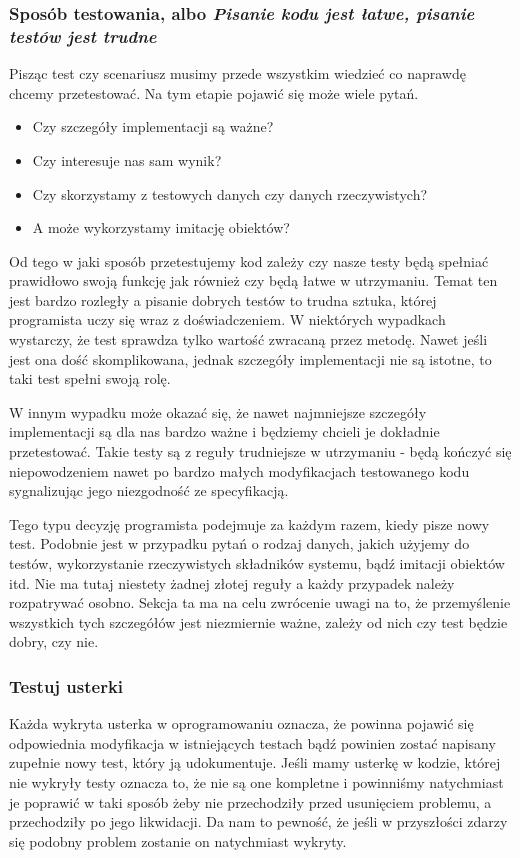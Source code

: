   \subsubsection{Sposób testowania, albo \emph{Pisanie kodu jest łatwe, pisanie testów jest trudne}}
  Pisząc test czy scenariusz musimy przede wszystkim wiedzieć co naprawdę chcemy przetestować. Na tym etapie pojawić się może wiele pytań.
  \begin{itemize}
    \item Czy szczegóły implementacji są ważne? 
    \item Czy interesuje nas sam wynik? 
    \item Czy skorzystamy z testowych danych czy danych rzeczywistych? 
    \item A może wykorzystamy imitację obiektów?
  \end{itemize}
  
  Od tego w jaki sposób przetestujemy kod zależy czy nasze testy będą spełniać prawidłowo swoją funkcję jak również czy będą łatwe w utrzymaniu. Temat ten jest bardzo rozległy a pisanie dobrych testów to trudna sztuka, której programista uczy się wraz z doświadczeniem. W niektórych wypadkach wystarczy, że test sprawdza tylko wartość zwracaną przez metodę. Nawet jeśli jest ona dość skomplikowana, jednak szczegóły implementacji nie są istotne, to taki test spełni swoją rolę. 
  
  W innym wypadku może okazać się, że nawet najmniejsze szczegóły implementacji są dla nas bardzo ważne i będziemy chcieli je dokładnie przetestować. Takie testy są z reguły trudniejsze w utrzymaniu - będą kończyć się niepowodzeniem nawet po bardzo małych modyfikacjach testowanego kodu sygnalizując jego niezgodność ze specyfikacją.
  
  Tego typu decyzję programista podejmuje za każdym razem, kiedy pisze nowy test. Podobnie jest w przypadku pytań o rodzaj danych, jakich użyjemy do testów, wykorzystanie rzeczywistych składników systemu, bądź imitacji obiektów itd. Nie ma tutaj niestety żadnej złotej reguły a każdy przypadek należy rozpatrywać osobno. Sekcja ta ma na celu zwrócenie uwagi na to, że przemyślenie wszystkich tych szczegółów jest niezmiernie ważne, zależy od nich czy test będzie dobry, czy nie.
  
  \subsubsection{Testuj usterki}
  Każda wykryta usterka w oprogramowaniu oznacza, że powinna pojawić się odpowiednia modyfikacja w istniejących testach bądź powinien zostać napisany zupełnie nowy test, który ją udokumentuje. Jeśli mamy usterkę w kodzie, której nie wykryły testy oznacza to, że nie są one kompletne i powinniśmy natychmiast je poprawić w taki sposób żeby nie przechodziły przed usunięciem problemu, a przechodziły po jego likwidacji. Da nam to pewność, że jeśli w przyszłości zdarzy się podobny problem zostanie on natychmiast wykryty.
  
